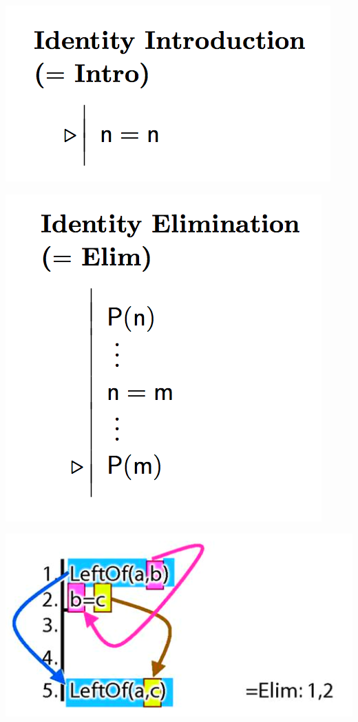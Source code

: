 \documentclass[12pt]{extarticle}
\begin{document}
\begin{multicols*}{3}
\begin{minipage} {\columnwidth}
\begin{center}
\includegraphics[scale=0.3]{img/rule_identity_intro.png}
\end{center}
\end{minipage}
\begin{center}
\includegraphics[scale=0.3]{img/rule_identity_elim.png}
\end{center}
\begin{center}
\includegraphics[scale=0.3]{img/proof_identity_example.png}
\end{center}
 

\end{multicols*}
\end{document}
